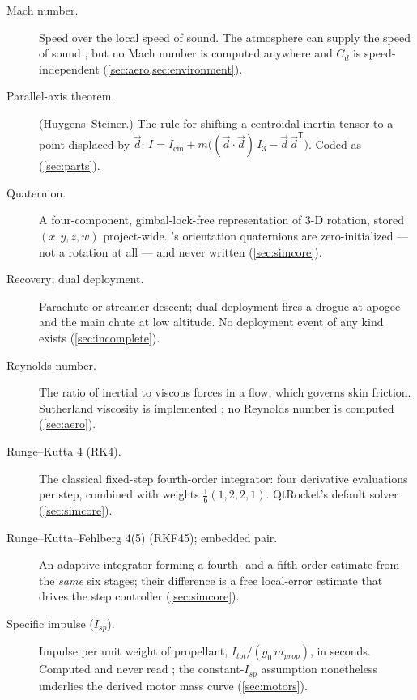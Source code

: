\begin{description}
\item[Mach number.] Speed over the local speed of sound. The atmosphere can supply the
  speed of sound , but no Mach number is computed
  anywhere and $C_d$ is speed-independent (\cref{sec:aero,sec:environment}).

\item[Parallel-axis theorem.] (Huygens--Steiner.) The rule for shifting a centroidal
  inertia tensor to a point displaced by $\vec d$:
  $I = I_{\mathrm{cm}} + m\big((\vec d\cdot\vec d)\,I_3 - \vec d\,\vec d^{\mathsf T}\big)$.
  Coded as   (\cref{sec:parts}).

\item[Quaternion.] A four-component, gimbal-lock-free representation of 3-D rotation,
  stored $(x, y, z, w)$ project-wide. 's orientation quaternions are
  zero-initialized --- not a rotation at all --- and never written 
  (\cref{sec:simcore}).

\item[Recovery; dual deployment.] Parachute or streamer descent; dual deployment fires a
  drogue at apogee and the main chute at low altitude. No deployment event of any kind
  exists (\cref{sec:incomplete}).

\item[Reynolds number.] The ratio of inertial to viscous forces in a flow, which governs
  skin friction. Sutherland viscosity is implemented
  ; no Reynolds number is computed (\cref{sec:aero}).

\item[Runge--Kutta 4 (RK4).] The classical fixed-step fourth-order integrator: four
  derivative evaluations per step, combined with weights $\tfrac16(1,2,2,1)$. QtRocket's
  default solver  (\cref{sec:simcore}).

\item[Runge--Kutta--Fehlberg 4(5) (RKF45); embedded pair.] An adaptive integrator forming a
  fourth- and a fifth-order estimate from the \emph{same} six stages; their difference is a
  free local-error estimate that drives the step controller 
  (\cref{sec:simcore}).

\item[Specific impulse ($I_{sp}$).] Impulse per unit weight of propellant,
  $I_{tot}/(g_0\, m_{prop})$, in seconds. Computed and never read
  ; the constant-$I_{sp}$ assumption nonetheless underlies
  the derived motor mass curve (\cref{sec:motors}).


\end{description}
